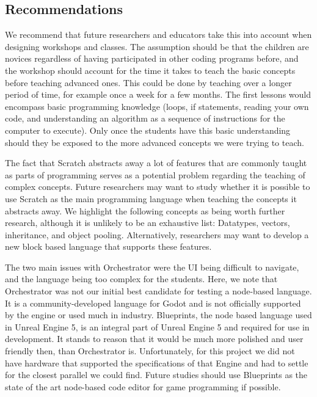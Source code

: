 \subsection{Recommendations}


We recommend that
future researchers and educators take this into account when
designing workshops and classes.
The assumption should be that the
children are novices regardless of having participated in other
coding programs before, and the workshop should account for the time
it takes to teach the basic concepts before teaching advanced ones.
This could be done by teaching over a longer period of time, for
example once a week for a few months.
The first lessons would
encompass basic programming knowledge (loops, if statements, reading
your own code, and understanding an algorithm as a sequence of
instructions for the computer to execute).
Only once the students
have this basic understanding should they be exposed to the more
advanced concepts we were trying to teach.

The fact that Scratch abstracts away a lot of features that are commonly taught as parts of programming serves as a potential problem regarding the teaching of complex concepts. Future researchers may want to study whether it is possible to use Scratch as the main programming language when teaching the concepts it abstracts away. We highlight the following concepts as being worth further research, although it is unlikely to be an exhaustive list: Datatypes, vectors, inheritance, and object pooling. Alternatively, researchers may want to develop a new block based language that supports these features.



The two main issues with Orchestrator were the UI being difficult to
navigate, and the language being too complex for the students.
Here,
we note that Orchestrator was not our initial best candidate for
testing a node-based language.
It is a community-developed language
for Godot and is not officially supported by the engine or used much
in industry.
Blueprints, the node based language used in Unreal
Engine 5, is an integral part of Unreal Engine 5 and required for use
in development.
It stands to reason that it would be much more
polished and user friendly then, than Orchestrator is.
Unfortunately,
for this project we did not have hardware that supported the
specifications of that Engine and had to settle for the closest
parallel we could find.
Future studies should use Blueprints as the
state of the art node-based code editor for game programming if
possible.

